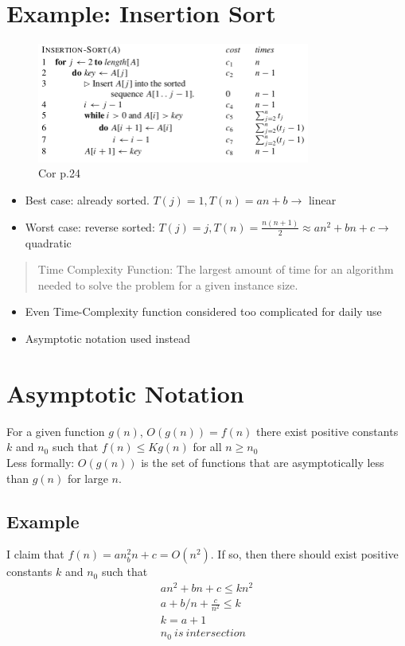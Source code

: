 \documentclass[12pt, letter]{article}
\begin{document}
\section{Example: Insertion Sort}%
\label{sec:example_insertion_sort}

\begin{figure}[h]
	\centering
	\includegraphics[width=0.8\textwidth]{imgs/insertion_sort.png}
	\caption{Cor p.24}
	\label{fig:imgs-insertion_sort-png}
\end{figure}
\begin{itemize}
	\item Best case: already sorted. $T(j)=1, T(n)=an+b \rightarrow$ linear
	\item Worst case: reverse sorted: $T(j)=j, T(n) = \frac{n(n+1)}{2} \approx an^2+bn+c\rightarrow$ quadratic
\end{itemize}

\begin{quote}
	Time Complexity Function: The largest amount of time for an algorithm needed to solve the problem for a given instance size.
\end{quote}

\begin{itemize}
	\item Even Time-Complexity function considered too complicated for daily use
	\item Asymptotic notation used instead
\end{itemize}

\section{Asymptotic Notation}%
\label{sec:asymptotic_notation}
For a given function $g(n)$, $O(g(n))=f(n)$ there exist positive constants $k$ and  $n_0$ such that  $f(n) \le Kg(n)$ for all  $n \ge n_0$ \\
Less formally: $O(g(n))$ is the set of functions that are asymptotically less than $g(n)$ for large  $n$.

\subsection*{Example}
I claim that $f(n) = an^2_bn+c = O(n^2) $. If so, then there should exist positive constants $k$ and  $n_0$ such that
\begin{gather*}
an^2+bn+c \le kn^2 \\
a+b/n +\frac{c}{n^2} \le k \\
k = a+1 \\
n_0\ is\ intersection
\end{gather*}
\end{document}

